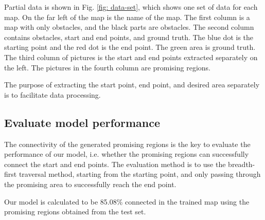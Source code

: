\documentclass[smallcondensed]{svjour3}     %
\begin{document}
Partial data is shown in Fig. \ref{fig: data-set}, which shows one set of data for each map.
On the far left of the map is the name of the map.
The first column is a map with only obstacles, and the black parts are obstacles.
The second column contains obstacles, start and end points, and ground truth.
The blue dot is the starting point and the red dot is the end point.
The green area is ground truth.
The third column of pictures is the start and end points extracted separately on the left.
The pictures in the fourth column are promising regions.

The purpose of extracting the start point, end point, and desired area separately is to facilitate data processing.

\subsection{Evaluate model performance}
The connectivity of the generated promising regions is the key to evaluate the performance of our model, i.e. whether the promising regions can successfully connect the start and end points.
The evaluation method is to use the breadth-first traversal method, starting from the starting point, and only passing through the promising area to successfully reach the end point.

Our model is calculated to be 85.08\% connected in the trained map using the promising regions obtained from the test set.
\end{document}

